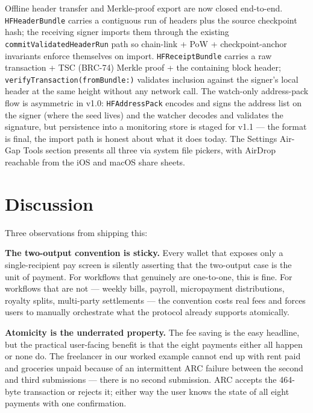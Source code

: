 \documentclass[a4paper, 11pt]{article}
\begin{document}
Offline header transfer and Merkle-proof export are now closed end-to-end. \texttt{HFHeaderBundle} carries a contiguous run of headers plus the source checkpoint hash; the receiving signer imports them through the existing \texttt{commitValidatedHeaderRun} path so chain-link + PoW + checkpoint-anchor invariants enforce themselves on import. \texttt{HFReceiptBundle} carries a raw transaction + TSC (BRC-74) Merkle proof + the containing block header; \texttt{verifyTransaction(fromBundle:)} validates inclusion against the signer's local header at the same height without any network call. The watch-only address-pack flow is asymmetric in v1.0: \texttt{HFAddressPack} encodes and signs the address list on the signer (where the seed lives) and the watcher decodes and validates the signature, but persistence into a monitoring store is staged for v1.1 --- the format is final, the import path is honest about what it does today. The Settings Air-Gap Tools section presents all three via system file pickers, with AirDrop reachable from the iOS and macOS share sheets.

\section{Discussion}

Three observations from shipping this:

\textbf{The two-output convention is sticky.} Every wallet that exposes only a single-recipient pay screen is silently asserting that the two-output case is the unit of payment. For workflows that genuinely are one-to-one, this is fine. For workflows that are not --- weekly bills, payroll, micropayment distributions, royalty splits, multi-party settlements --- the convention costs real fees and forces users to manually orchestrate what the protocol already supports atomically.

\textbf{Atomicity is the underrated property.} The fee saving is the easy headline, but the practical user-facing benefit is that the eight payments either all happen or none do. The freelancer in our worked example cannot end up with rent paid and groceries unpaid because of an intermittent ARC failure between the second and third submissions --- there is no second submission. ARC accepts the 464-byte transaction or rejects it; either way the user knows the state of all eight payments with one confirmation.
\end{document}
